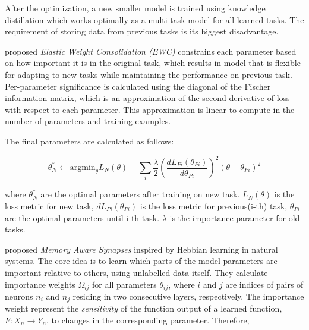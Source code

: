 \documentclass[11pt,a4paper]{article}
\begin{document}
After the optimization, a new smaller model is trained using knowledge distillation which works optimally as a multi-task model for all learned tasks. The requirement of storing data from previous tasks is its biggest disadvantage.

\citet{DBLP:journals/corr/KirkpatrickPRVD16} proposed  \textit{Elastic Weight Consolidation (EWC)} constrains each parameter based on how important it is in the original task, which results in model that is flexible for adapting to new tasks while maintaining the performance on previous task. Per-parameter significance is calculated using the diagonal of the Fischer information matrix, which is an approximation of the second derivative of loss with respect to each parameter. This approximation is linear to compute in the number of parameters and training examples.

The final parameters are calculated as follows:

\begin{equation}
\theta_N^* \leftarrow \text{argmin}_{\theta} L_N(\theta) + \sum_i \dfrac{\lambda}{2} (\dfrac{dL_{Pi}(\theta_{Pi})}{d\theta_{Pi}})^2(\theta - \theta_{Pi})^2 
\end{equation}

where $\theta_N^*$ are the optimal parameters after training on new task. $L_N(\theta)$ is the loss metric for new task, $dL_{Pi}(\theta_{Pi})$ is the loss metric for previous(i-th) task, $\theta_{Pi} $ are the optimal parameters until i-th task. $\lambda$ is the importance parameter for old tasks.


 \citet{aljundi2018memory} proposed \textit{Memory Aware Synapses} inspired by Hebbian learning in natural systems. The core idea is to learn which parts of the model parameters are important relative to others, using unlabelled data itself. They calculate importance weights $\Omega_{ij}$ for all parameters $\theta_{ij}$, where $i$ and $j$ are indices of pairs of neurons $n_i$ and $n_j$ residing in two consecutive layers, respectively. The importance weight represent the \textit{sensitivity} of the function output of a learned function, $F:X_n \longrightarrow Y_n$, to changes in the corresponding parameter. Therefore,
\end{document}
